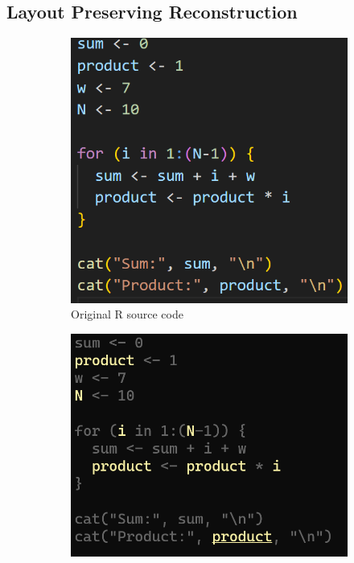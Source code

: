\documentclass[a3paper, portrait, english, default]{uulm-cs-poster}
\begin{document}
\begin{multicols}{2}
\section*{Layout Preserving Reconstruction}
	\begin{figure}
		\begin{subfigure}[b]{0.2\textwidth}
			\includegraphics[scale=0.9]{Screenshot 2024-01-26 131317.png}
			\caption{Original R source code}
			\label{Fig.1}
		\end{subfigure}
		\begin{subfigure}[b]{0.2\textwidth}
			\includegraphics[scale=0.7]{Screenshot 2024-01-30 142858.png}

\end{subfigure}
\end{figure}
\end{multicols}
\end{document}
